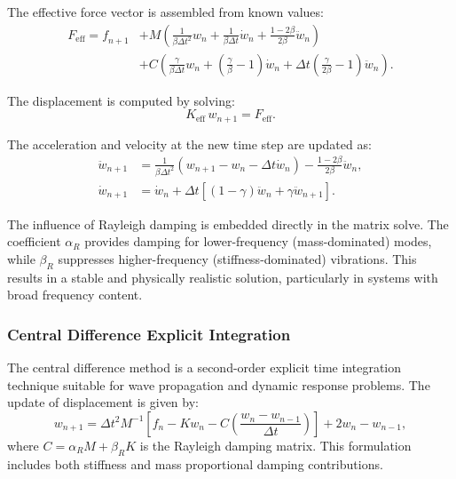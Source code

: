 \documentclass{article}
\begin{document}
	The effective force vector is assembled from known values:
	\begin{align}
		\mathit{{F}}_{\text{eff}} = \mathit{{f}}_{n+1}
		&+ \mathit{{M}} \left( \frac{1}{\beta \Delta t^2} \mathit{{w}}_n + \frac{1}{\beta \Delta t} \dot{\mathit{{w}}}_n + \frac{1 - 2\beta}{2\beta} \ddot{\mathit{{w}}}_n \right) \\
		&+ \mathit{{C}} \left( \frac{\gamma}{\beta \Delta t} \mathit{{w}}_n + \left( \frac{\gamma}{\beta} - 1 \right) \dot{\mathit{{w}}}_n + \Delta t \left( \frac{\gamma}{2\beta} - 1 \right) \ddot{\mathit{{w}}}_n \right).
	\end{align}
	
	The displacement is computed by solving:
	\begin{equation}
		\mathit{{K}}_{\text{eff}}\, \mathit{{w}}_{n+1} = \mathit{{F}}_{\text{eff}}.
	\end{equation}
	
	The acceleration and velocity at the new time step are updated as:
	\begin{align}
		\ddot{\mathit{{w}}}_{n+1} &= \frac{1}{\beta \Delta t^2} \left( \mathit{{w}}_{n+1} - \mathit{{w}}_n - \Delta t \dot{\mathit{{w}}}_n \right) - \frac{1 - 2\beta}{2\beta} \ddot{\mathit{{w}}}_n, \\
		\dot{\mathit{{w}}}_{n+1} &= \dot{\mathit{{w}}}_n + \Delta t \left[ (1 - \gamma) \ddot{\mathit{{w}}}_n + \gamma \ddot{\mathit{{w}}}_{n+1} \right].
	\end{align}
	
	The influence of Rayleigh damping is embedded directly in the matrix solve. The coefficient \( \alpha_R \) provides damping for lower-frequency (mass-dominated) modes, while \( \beta_R \) suppresses higher-frequency (stiffness-dominated) vibrations. This results in a stable and physically realistic solution, particularly in systems with broad frequency content.
	
	
	\subsubsection{Central Difference Explicit Integration}
	
	The central difference method is a second-order explicit time integration technique suitable for wave propagation and dynamic response problems. The update of displacement is given by:
	\begin{equation}
		{w}_{n+1} = \Delta t^2 {M}^{-1} \left[ {f}_n - {K} {w}_n - {C} \left( \frac{{w}_n - {w}_{n-1}}{\Delta t} \right) \right] + 2{w}_n - {w}_{n-1},
	\end{equation}
	where \( {C} = \alpha_R {M} + \beta_R {K} \) is the Rayleigh damping matrix. This formulation includes both stiffness and mass proportional damping contributions.
	
\end{document}
